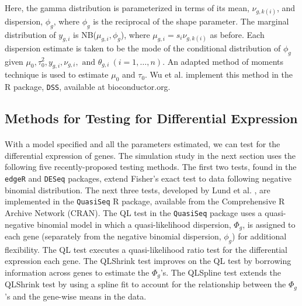 \documentclass[10pt]{article}
\begin{document}
\paragraph{} \indent Here, the gamma distribution is parameterized in terms of its mean, $\nu_{g, k(i)}$, and dispersion, $\phi_g$, where $\phi_g$ is the reciprocal of the shape parameter. The marginal distribution of $y_{g, i}$ is NB($\mu_{g, i}, \phi_g$), where $\mu_{g, i} = s_i \nu_{g, k(i)}$ as before. Each dispersion estimate is taken to be the mode of the conditional distribution of $\phi_g$ given $\mu_0, \tau_0^2, y_{g, i}, \nu_{g, i}, \text{ and } \theta_{g, i} \ (i = 1, \ldots, n)$. An adapted method of moments technique is used to estimate $\mu_0$ and $\tau_0$. Wu et al. \cite{dss} implement this method in the R package, {\tt DSS}, available at bioconductor.org.







\subsection*{Methods for Testing for Differential Expression} \label{sec:test}

\paragraph{} \indent With a model specified and all the parameters estimated, we can test for the differential expression of genes. The simulation study in the next section uses the following five recently-proposed testing methods. The first two tests, found in the {\tt edgeR} and {\tt DESeq} packages, extend Fisher's exact test to data following negative binomial distribution. The next three tests, developed by Lund et al. \cite{quasiseq}, are implemented in the {\tt QuasiSeq} R package, available from the Comprehensive R Archive Network (CRAN). The QL test in the {\tt QuasiSeq} package uses a quasi-negative binomial model in which a quasi-likelihood dispersion, $\Phi_g$, is assigned to each gene (separately from the negative binomial dispersion, $\phi_g$) for additional flexibility. The QL test executes a quasi-likelihood ratio test for the differential expression each gene. The QLShrink test improves on the QL test by borrowing information across genes to estimate the $\Phi_g$'s. The QLSpline test extends the QLShrink test by using a spline fit to account for the relationship between the $\Phi_g$'s and the gene-wise means in the data.
\end{document}
